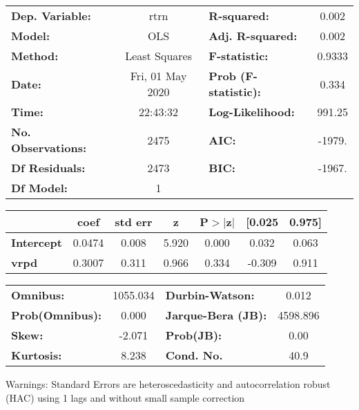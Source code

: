 \begin{center}
\begin{tabular}{lclc}
\toprule
\textbf{Dep. Variable:}    &       rtrn       & \textbf{  R-squared:         } &     0.002   \\
\textbf{Model:}            &       OLS        & \textbf{  Adj. R-squared:    } &     0.002   \\
\textbf{Method:}           &  Least Squares   & \textbf{  F-statistic:       } &    0.9333   \\
\textbf{Date:}             & Fri, 01 May 2020 & \textbf{  Prob (F-statistic):} &    0.334    \\
\textbf{Time:}             &     22:43:32     & \textbf{  Log-Likelihood:    } &    991.25   \\
\textbf{No. Observations:} &        2475      & \textbf{  AIC:               } &    -1979.   \\
\textbf{Df Residuals:}     &        2473      & \textbf{  BIC:               } &    -1967.   \\
\textbf{Df Model:}         &           1      & \textbf{                     } &             \\
\bottomrule
\end{tabular}
\begin{tabular}{lcccccc}
                   & \textbf{coef} & \textbf{std err} & \textbf{z} & \textbf{P$> |$z$|$} & \textbf{[0.025} & \textbf{0.975]}  \\
\midrule
\textbf{Intercept} &       0.0474  &        0.008     &     5.920  &         0.000        &        0.032    &        0.063     \\
\textbf{vrpd}      &       0.3007  &        0.311     &     0.966  &         0.334        &       -0.309    &        0.911     \\
\bottomrule
\end{tabular}
\begin{tabular}{lclc}
\textbf{Omnibus:}       & 1055.034 & \textbf{  Durbin-Watson:     } &    0.012  \\
\textbf{Prob(Omnibus):} &   0.000  & \textbf{  Jarque-Bera (JB):  } & 4598.896  \\
\textbf{Skew:}          &  -2.071  & \textbf{  Prob(JB):          } &     0.00  \\
\textbf{Kurtosis:}      &   8.238  & \textbf{  Cond. No.          } &     40.9  \\
\bottomrule
\end{tabular}
\end{center}

Warnings: \newline
 [1] Standard Errors are heteroscedasticity and autocorrelation robust (HAC) using 1 lags and without small sample correction